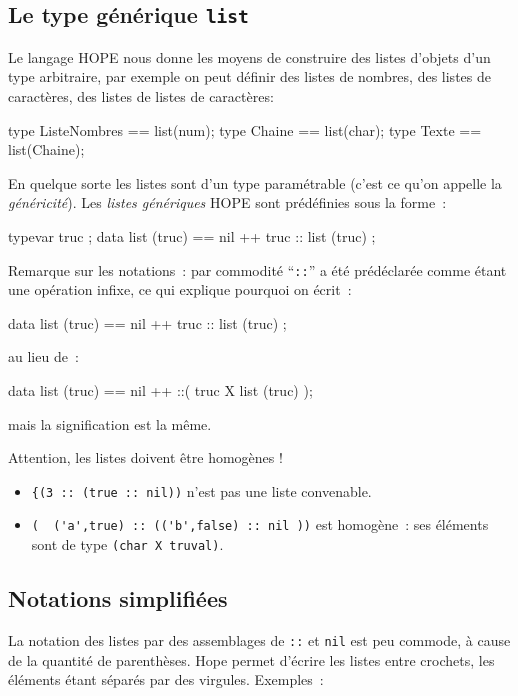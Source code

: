 \subsection{Le type générique \texttt{list}}

Le langage HOPE nous donne les moyens de construire des listes
d'objets d'un type arbitraire, par exemple on peut définir des listes
de nombres, des listes de caractères, des listes de listes de
caractères:

\begin{verbatimtab}
type ListeNombres == list(num);
type Chaine == list(char);
type Texte == list(Chaine);
\end{verbatimtab}

En quelque sorte les listes sont d'un type paramétrable (c'est ce
qu'on appelle la \emph{généricité}). Les \emph{listes génériques} HOPE sont
prédéfinies sous la forme~:

\begin{verbatimtab}
typevar truc ;
data list (truc) == nil 
                 ++  truc ::  list (truc) ;
\end{verbatimtab}

Remarque sur les notations~: par commodité ``\verb+::+'' a été
prédéclarée comme étant une opération infixe, ce qui explique pourquoi
on écrit~:
\begin{verbatimtab}
data list (truc) == nil 
                 ++  truc :: list (truc)  ;
\end{verbatimtab}
au lieu de~:
\begin{verbatimtab}
data list (truc) == nil 
		 ++  ::( truc X list (truc)  );
\end{verbatimtab}
mais la signification est  la m\^eme.

Attention, les listes doivent \^etre homogènes !

\begin{itemize}
\item \verb+{(3 :: (true :: nil))+ n'est pas une liste convenable.
\item \verb+(  ('a',true) :: (('b',false) :: nil ))+ est homogène~: 
ses éléments sont de type \verb+(char X truval)+.
\end{itemize}

\subsection{Notations simplifiées}

La notation des listes par des assemblages de \verb+::+ et \verb+nil+
est peu commode, à cause de la quantité de parenthèses. Hope permet
d'écrire les listes entre crochets, les éléments étant séparés par des
virgules. Exemples~:

